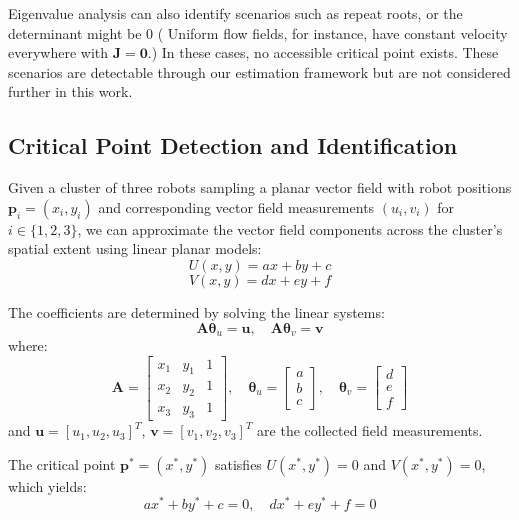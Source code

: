\documentclass[lettersize,journal]{IEEEtran}
\begin{document}
Eigenvalue analysis can also identify scenarios such as repeat roots, or the determinant might be 0 ( Uniform flow fields, for instance, have constant velocity everywhere with $\mathbf{J} = \mathbf{0}$.) In these cases, no accessible critical point exists. These scenarios are detectable through our estimation framework but are not considered further in this work.


\subsection{Critical Point Detection and Identification}
\noindent

Given a cluster of three robots sampling a planar vector field with robot positions $\mathbf{p}_i = (x_i, y_i)$ and corresponding vector field measurements $(u_i, v_i)$ for $i \in \{1, 2, 3\}$, we can approximate the vector field components across the cluster's spatial extent using linear planar models:
\begin{equation}
U(x,y) = ax + by + c
\end{equation}
\begin{equation}
V(x,y) = dx + ey + f
\end{equation}

The coefficients are determined by solving the linear systems:
\begin{equation}
\mathbf{A}\boldsymbol{\theta}_u = \mathbf{u}, \quad \mathbf{A}\boldsymbol{\theta}_v = \mathbf{v}
\end{equation}
where:
\begin{equation}
\mathbf{A} = \begin{bmatrix} x_1 & y_1 & 1 \\ x_2 & y_2 & 1 \\ x_3 & y_3 & 1 \end{bmatrix}, \quad \boldsymbol{\theta}_u = \begin{bmatrix} a \\ b \\ c \end{bmatrix}, \quad \boldsymbol{\theta}_v = \begin{bmatrix} d \\ e \\ f \end{bmatrix}
\end{equation}
and $\mathbf{u} = [u_1, u_2, u_3]^T$, $\mathbf{v} = [v_1, v_2, v_3]^T$ are the collected field measurements.

The critical point $\mathbf{p}^* = (x^*, y^*)$ satisfies $U(x^*, y^*) = 0$ and $V(x^*, y^*) = 0$, which yields:
\begin{equation}
ax^* + by^* + c = 0, \quad dx^* + ey^* + f = 0
\end{equation}
\end{document}
